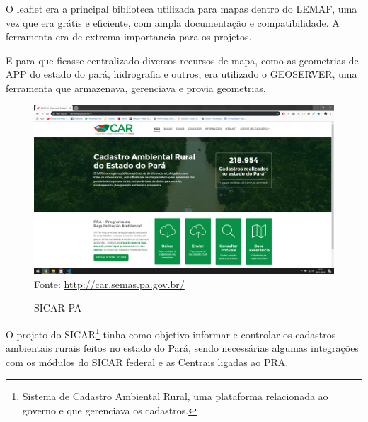 O leaflet era a principal biblioteca utilizada para mapas dentro do LEMAF, uma vez que era grátis e eficiente, com ampla documentação e compatibilidade. A ferramenta era de extrema importancia para os projetos.

E para que ficasse centralizado diversos recursos de mapa, como as geometrias de APP do estado do pará, hidrografia e outros, era utilizado o GEOSERVER, uma ferramenta que armazenava, gerenciava e provia geometrias.

\begin{figure}[H]
\centering
\caption{SICAR-PA} %
\includegraphics[scale=0.3]{SICAR}\\  %
{\small Fonte: \url{http://car.semas.pa.gov.br/}} %
\label{fig:exemplo} %
\end{figure}

O projeto do SICAR\footnote{Sistema de Cadastro Ambiental Rural, uma plataforma relacionada ao governo e que gerenciava os cadastros.} tinha como objetivo informar e controlar os cadastros ambientais rurais feitos no estado do Pará, sendo necessárias algumas integrações com os módulos do SICAR federal e as Centrais ligadas ao PRA.


